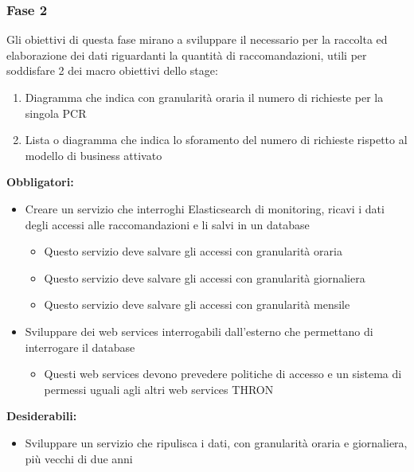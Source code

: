 \documentclass[a4paper, 12pt, twoside, openright]{book}
\begin{document}
\subsubsection{Fase 2}
Gli obiettivi di questa fase mirano a sviluppare il necessario per la raccolta ed elaborazione dei dati riguardanti la quantità di raccomandazioni, utili per soddisfare 2 dei macro obiettivi dello stage:
\begin{enumerate}
	\item Diagramma che indica con granularità oraria il numero di richieste per la singola PCR
	\item Lista o diagramma che indica lo sforamento del numero di richieste rispetto al modello di business attivato
\end{enumerate}
\textbf{Obbligatori:}
\begin{itemize}
	\item Creare un servizio che interroghi Elasticsearch di monitoring, ricavi i dati degli accessi alle raccomandazioni e li salvi in un database
	\begin{itemize}
		\item Questo servizio deve salvare gli accessi con granularità oraria
		\item Questo servizio deve salvare gli accessi con granularità giornaliera
		\item Questo servizio deve salvare gli accessi con granularità mensile
	\end{itemize}
	\item Sviluppare dei web services interrogabili dall'esterno che permettano di interrogare il database
	\begin{itemize}
		\item Questi web services devono prevedere politiche di accesso e un sistema di permessi uguali agli altri web services THRON
	\end{itemize}
\end{itemize}
\textbf{Desiderabili:}
\begin{itemize}
	\item Sviluppare un servizio che ripulisca i dati, con granularità oraria e giornaliera, più vecchi di due anni
\end{itemize}
\end{document}
